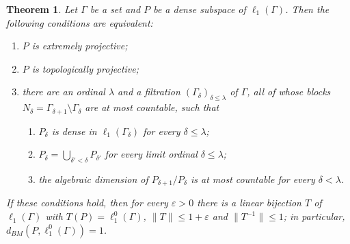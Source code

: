 \documentclass[12pt]{article}
\newtheorem{theorem}{Theorem}[section]
\newcommand{\lo}[1]{\ell_1^0(#1)}
\newcommand{\ellone}[1]{\ell_1(#1)}
\newcommand{\norm}[1]{\lVert #1\rVert}
\newcommand{\BM}{d_{BM}}
\begin{document}
\begin{theorem}\label{CountableBlocksCriterion} Let $\Gamma$ be a set and
    $P$ be a dense subspace of $\ellone{\Gamma}$. Then the following
    conditions are equivalent:
    \begin{enumerate}[label = (\roman*)]
        \item $P$ is extremely projective;
        \item $P$ is topologically projective;
        \item there are an ordinal $\lambda$ and a filtration
              ${(\Gamma_\delta)}_{\delta\leq\lambda}$ of $\Gamma$, all of whose
              blocks $N_\delta=\Gamma_{\delta+1}\setminus\Gamma_\delta$ are at
              most countable, such that
              \begin{enumerate}[label = (\alph*)]
                  \item $P_\delta$ is dense in $\ellone{\Gamma_\delta}$ for
                        every $\delta\leq\lambda$;
                  \item $P_\delta=\bigcup_{\delta'<\delta}P_{\delta'}$ for
                        every limit ordinal $\delta\leq\lambda$;
                  \item the algebraic dimension of $P_{\delta+1}/P_\delta$ is
                        at most countable for every $\delta<\lambda$.
              \end{enumerate}
    \end{enumerate}
    If these conditions hold, then for every $\varepsilon>0$ there is a
    linear bijection $T$ of $\ellone{\Gamma}$ with $T(P)=\lo{\Gamma}$,
    $\norm{T}\leq 1+\varepsilon$ and $\norm{T^{-1}}\leq 1$; in particular,
    $\BM(P,\lo{\Gamma})=1$.
\end{theorem}
\end{document}
